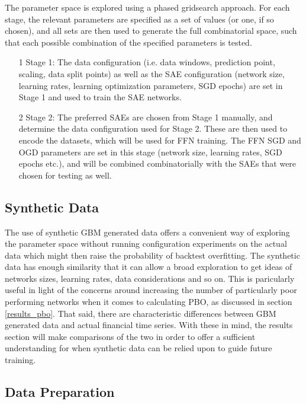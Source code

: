 \documentclass[a4paper,11pt,oneside]{article}
\theoremstyle{plain}
\theoremstyle{definition}
\begin{document}
	The parameter space is explored using a phased gridsearch approach. For each stage, the relevant parameters are specified as a set of values (or one, if so chosen), and all sets are then used to generate the full combinatorial space, such that each possible combination of the specified parameters is tested.
	
	\begin{itemize}
		\item[1] Stage 1: The data configuration (i.e. data windows, prediction point, scaling, data split points) as well as the SAE configuration (network size, learning rates, learning optimization parameters, SGD epochs) are set in Stage 1 and used to train the SAE networks.
		\item[2] Stage 2: The preferred SAEs are chosen from Stage 1 manually, and determine the data configuration used for Stage 2. These are then used to encode the datasets, which will be used for FFN training. The FFN SGD and OGD parameters are set in this stage (network size, learning rates, SGD epochs etc.), and will be combined combinatorially with the SAEs that were chosen for testing as well.
	\end{itemize}
	
	\subsection{Synthetic Data}\label{proc_synthetic}
	
	The use of synthetic GBM generated data offers a convenient way of exploring the parameter space without running configuration experiments on the actual data which might then raise the probability of backtest overfitting. The synthetic data has enough similarity that it can allow a broad exploration to get ideas of networks sizes, learning rates, data considerations and so on. This is paricularly useful in light of the concerns around increasing the number of particularly poor performing networks when it comes to calculating PBO, as discussed in section \ref{results_pbo}. That said, there are characteristic differences between GBM generated data and actual financial time series. With these in mind, the results section will make comparisons of the two in order to offer a sufficient understanding for when synthetic data can be relied upon to guide future training.
	
	\subsection{Data Preparation}\label{proc_dataprep}
	
\end{document}
